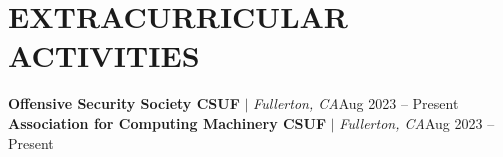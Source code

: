 \section{EXTRACURRICULAR ACTIVITIES}
    \resumeSubHeadingListStart
    
        \resumeProjectHeading
          {\textbf{Offensive Security Society CSUF} $|$ \emph{Fullerton, CA}}{Aug 2023 -- Present}
        \resumeProjectHeading
          {\textbf{Association for Computing Machinery CSUF} $|$ \emph{Fullerton, CA}}{Aug 2023 -- Present}
   
    \resumeSubHeadingListEnd